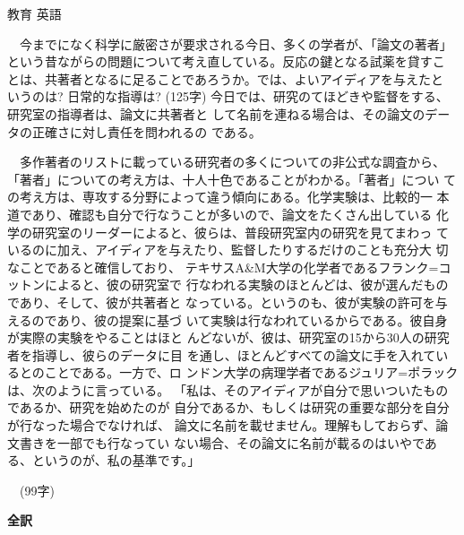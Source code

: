 \documentclass[fleqn]{jbook}
\begin{document}
\begin{answer}{教育 英語}{}
\begin{subanswers}
　今までになく科学に厳密さが要求される今日、多くの学者が、「論文の著者」
という昔ながらの問題について考え直している。反応の鍵となる試薬を貸すこ
とは、共著者となるに足ることであろうか。では、よいアイディアを与えたと
いうのは? 日常的な指導は? 
(125字)
今日では、研究のてほどきや監督をする、研究室の指導者は、論文に共著者と
して名前を連ねる場合は、その論文のデータの正確さに対し責任を問われるの
である。

　多作著者のリストに載っている研究者の多くについての非公式な調査から、
「著者」についての考え方は、十人十色であることがわかる。「著者」につい
ての考え方は、専攻する分野によって違う傾向にある。化学実験は、比較的一
本道であり、確認も自分で行なうことが多いので、論文をたくさん出している
化学の研究室のリーダーによると、彼らは、普段研究室内の研究を見てまわっ
ているのに加え、アイディアを与えたり、監督したりするだけのことも充分大
切なことであると確信しており、
テキサスA\&M大学の化学者であるフランク=コットンによると、彼の研究室で
行なわれる実験のほとんどは、彼が選んだものであり、そして、彼が共著者と
なっている。というのも、彼が実験の許可を与えるのであり、彼の提案に基づ
いて実験は行なわれているからである。彼自身が実際の実験をやることはほと
んどないが、彼は、研究室の15から30人の研究者を指導し、彼らのデータに目
を通し、ほとんどすべての論文に手を入れているとのことである。一方で、ロ
ンドン大学の病理学者であるジュリア=ポラックは、次のように言っている。
「私は、そのアイディアが自分で思いついたものであるか、研究を始めたのが
自分であるか、もしくは研究の重要な部分を自分が行なった場合でなければ、
論文に名前を載せません。理解もしておらず、論文書きを一部でも行なってい
ない場合、その論文に名前が載るのはいやである、というのが、私の基準です。」 

　(99字)



\SubAnswer
 {\bf 全訳}


\end{subanswers}
\end{answer}
\end{document}
